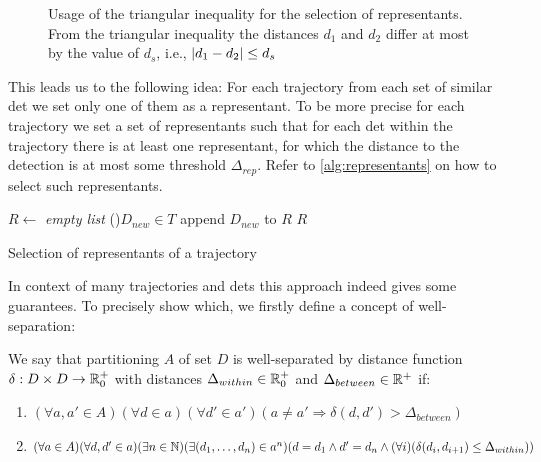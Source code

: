 \begin{figure}
    \centering
    \Large
    \def\svgwidth{\columnwidth}
    \scalebox{0.6}{}
    \caption[Usage of triangular inequality for the selection of representants]{Usage of the triangular inequality for the selection of representants. From the triangular inequality the distances $d_1$ and $d_2$ differ at most by the value of $d_s$, i.e., $\left|{d_1 - d_2}\right| \leq d_s$}
    \label{fig:triangular}
\end{figure}

This leads us to the following idea: For each trajectory from each set of similar \gls{det} we set only one of them as a representant. To be more precise for each trajectory we set a set of representants such that for each \gls{det} within the trajectory there is at least one representant, for which the distance to the detection is at most some threshold $\Delta_{rep}$. Refer to \autoref{alg:representants} on how to select such representants.

\begin{algorithm}

 
 \BlankLine
 $R \leftarrow$ \emph{empty list}\;
 \For(){$D_{new} \in T$}{
  append $D_{new}$ to $R$\;
 }
 \Return $R$
 \caption{Selection of representants of a trajectory}
 \label{alg:representants}
\end{algorithm}

In context of many trajectories and \glspl{det} this approach indeed gives some guarantees. To precisely show which, we firstly define a concept of well-separation:

\begin{defn}
\label{defn:well_sep}
We say that partitioning $A$ of set $D$ is well-separated by distance function $\delta: D \times D \rightarrow \mathbb{R}_0^+$ with distances $\Delta_{within} \in \mathbb{R}_0^+$ and $\Delta_{between} \in \mathbb{R}^+$ if:
\begin{enumerate}[label=(\roman*)]
    \item $(\forall a, a' \in A) (\forall d \in a) (\forall d' \in a') (a \neq a' \Rightarrow \delta(d, d') > \Delta_{between})$ \label{item:between}
    \item $(\forall a \in A)(\forall d, d' \in a) (\exists n \in \mathbb{N}) (\exists (d_1, \ldots, d_n) \in a^n) (d = d_1 \land d' = d_n \land (\forall i) (\delta(d_i, d_{i+1}) \leq \Delta_{within}))$ \label{item:within}
\end{enumerate}
\end{defn}

